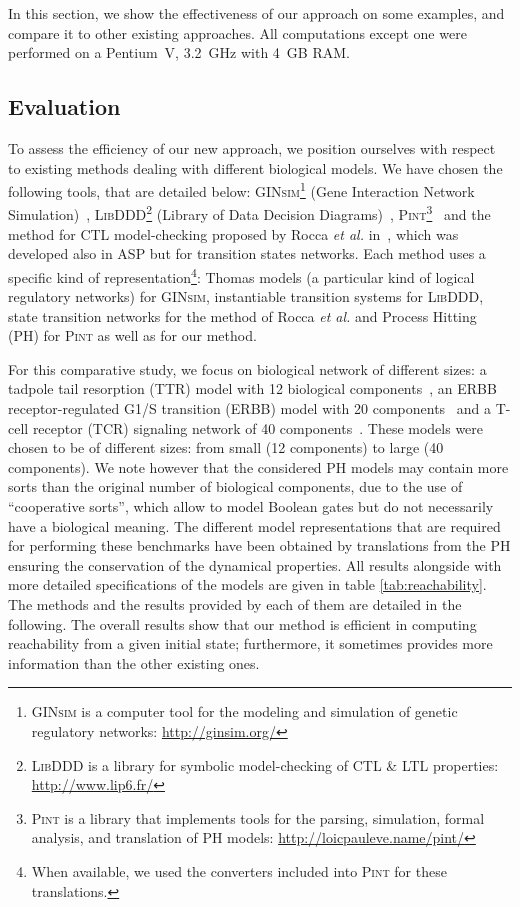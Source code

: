 In this section, we show the effectiveness of our approach on some examples,
and compare it to other existing approaches.
All computations except one were performed on a Pentium~V, 3.2~GHz with 4~GB RAM.

\subsection{Evaluation}
To assess the efficiency of our new approach,
we position ourselves with respect to existing methods dealing with different biological models.
We have chosen the following tools, that are detailed below: 
\textsc{GINsim}\footnote{\textsc{GINsim} is a computer tool for the modeling and simulation of genetic regulatory networks: \url{http://ginsim.org/}} (Gene Interaction Network Simulation)~\cite{gonzalez2006ginsim,naldi2009logical,naldi2007decision},
\textsc{LibDDD}\footnote{\textsc{LibDDD} is a library for symbolic model-checking of CTL \& LTL properties: \url{http://www.lip6.fr/}}
(Library of Data Decision Diagrams)~\cite{thierry2009hierarchical,colange2013towards},
\textsc{Pint}\footnote{\textsc{Pint} is a library that implements tools for the parsing, simulation, formal analysis, and translation of PH models: \url{http://loicpauleve.name/pint/}}~\cite{PMR12-MSCS}
and the method for CTL model-checking proposed by Rocca \textit{et al.} in~\cite{roccaasp},
which was developed also in ASP but for transition states networks.
Each method uses a specific kind of representation\footnote{When available, we used the converters included into \textsc{Pint} for these translations.}:
Thomas models (a particular kind of logical regulatory networks) for \textsc{GINsim},
instantiable transition systems for \textsc{LibDDD},
state transition networks for the method of Rocca \textit{et al.}
and Process Hitting (PH) for \textsc{Pint} as well as for our method.

For this comparative study, we focus on biological network of different sizes:
a tadpole tail resorption (TTR) model with 12 biological components~\cite{khalis2009smbionet},
an ERBB receptor-regulated G1/S transition (ERBB) model with 20 components~\cite{Samaga2009}
and a T-cell receptor (TCR) signaling network of 40 components~\cite{Klamt06}.
These models were chosen to be of different sizes:
from small (12 components) to large (40 components).
We note however that the considered PH models may contain more sorts than
the original number of biological components, due to the use of
“cooperative sorts”, which allow to model Boolean gates but do not necessarily
have a biological meaning.
The different model representations that are required for performing these benchmarks have been obtained by translations
from the PH
ensuring the conservation of the dynamical properties.
All results alongside with more detailed specifications of the models
are given in table \ref{tab:reachability}.
The methods and the results provided by each of them are detailed in the following.
The overall results show that our method is efficient in computing reachability
from a given initial state;
furthermore, it sometimes provides more information than the other existing ones.

